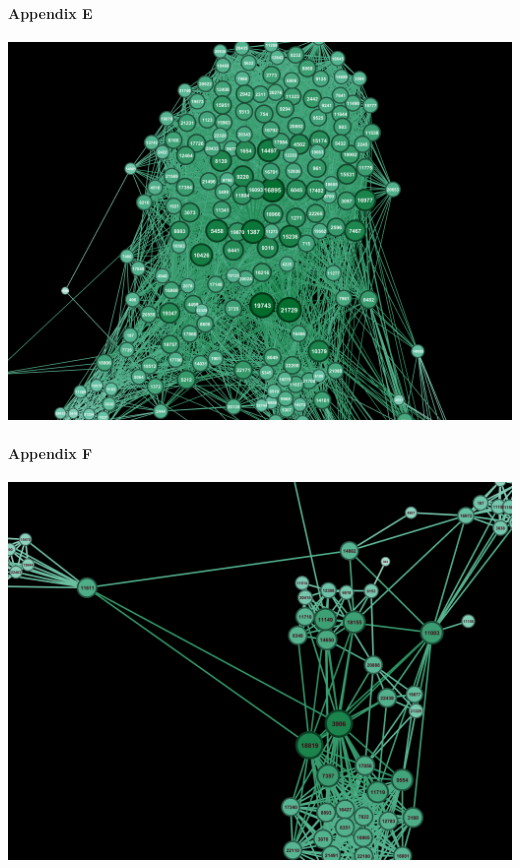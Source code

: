 \documentclass[11pt,twocolumn]{article}
\begin{document}
\paragraph{{\newline\newline}Appendix E\newline\newline\newline\newline\newline}
\includegraphics[scale=0.22]{closennesscentraility_gov.png}
\paragraph{{\newline}Appendix F\newline\newline\newline\newline\newline}
\includegraphics[scale=0.22]{closennesscentraility_pol.png}
\end{document}
